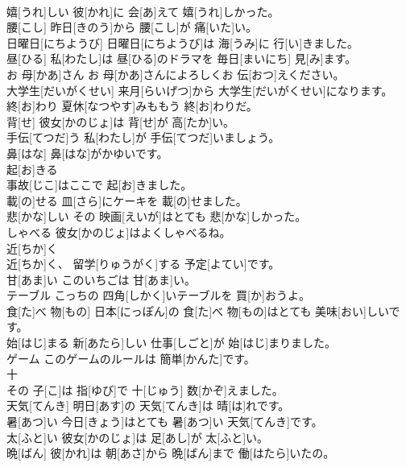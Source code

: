 \documentclass[8pt]{extreport}
\begin{document}
\begin{CJK}{UTF8}{min}
\\	嬉[うれ]しい	彼[かれ]に 会[あ]えて 嬉[うれ]しかった。		
\\	腰[こし]	昨日[きのう]から 腰[こし]が 痛[いた]い。		
\\	日曜日[にちようび]	日曜日[にちようび]は 海[うみ]に 行[い]きました。		
\\	昼[ひる]	私[わたし]は 昼[ひる]のドラマを 毎日[まいにち] 見[み]ます。		
\\	お 母[かあ]さん	お 母[かあ]さんによろしくお 伝[おつ]えください。		
\\	大学生[だいがくせい]	来月[らいげつ]から 大学生[だいがくせい]になります。		
\\	終[お]わり	夏休[なつやす]みももう 終[お]わりだ。		
\\	背[せ]	彼女[かのじょ]は 背[せ]が 高[たか]い。		
\\	手伝[てつだ]う	私[わたし]が 手伝[てつだ]いましょう。		
\\	鼻[はな]	鼻[はな]がかゆいです。		
\\	起[お]きる
\\	事故[じこ]はここで 起[お]きました。		
\\	載[の]せる	皿[さら]にケーキを 載[の]せました。		
\\	悲[かな]しい	その 映画[えいが]はとても 悲[かな]しかった。		
\\	しゃべる	彼女[かのじょ]はよくしゃべるね。		
\\	近[ちか]く 
\\	近[ちか]く、 留学[りゅうがく]する 予定[よてい]です。		
\\	甘[あま]い	このいちごは 甘[あま]い。		
\\	テーブル	こっちの 四角[しかく]いテーブルを 買[か]おうよ。		
\\	食[た]べ 物[もの]	日本[にっぽん]の 食[た]べ 物[もの]はとても 美味[おい]しいです。		
\\	始[はじ]まる	新[あたら]しい 仕事[しごと]が 始[はじ]まりました。		
\\	ゲーム	このゲームのルールは 簡単[かんた]です。		
\\	十
\\	[じゅう]	その 子[こ]は 指[ゆび]で 十[じゅう] 数[かぞ]えました。		
\\	天気[てんき]	明日[あす]の 天気[てんき]は 晴[は]れです。		
\\	暑[あつ]い	今日[きょう]はとても 暑[あつ]い 天気[てんき]です。		
\\	太[ふと]い	彼女[かのじょ]は 足[あし]が 太[ふと]い。		
\\	晩[ばん]	彼[かれ]は 朝[あさ]から 晩[ばん]まで 働[はたら]いたの。		

\end{CJK}
\end{document}
